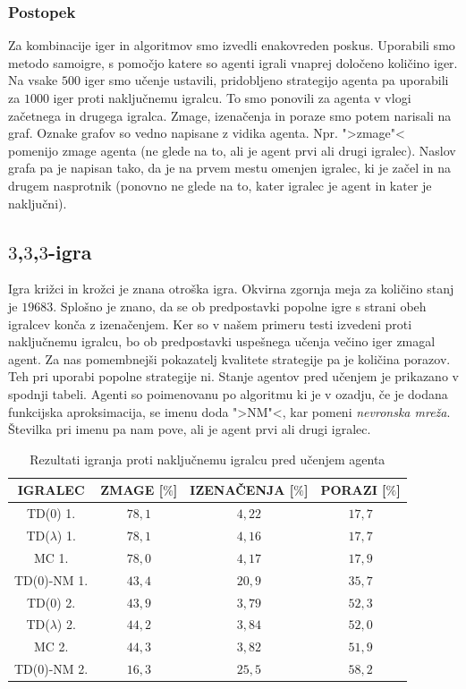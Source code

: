 \documentclass[12pt,a4paper]{amsart}
\theoremstyle{definition} %
\theoremstyle{plain} %
\begin{document}
\subsubsection{Postopek}
Za kombinacije iger in algoritmov smo izvedli enakovreden poskus. Uporabili smo metodo samoigre, 
s pomočjo katere so agenti igrali vnaprej določeno količino iger. Na vsake $500$ iger smo učenje 
ustavili, pridobljeno strategijo agenta pa uporabili za $1000$ iger proti naključnemu igralcu. To smo 
ponovili za agenta v vlogi začetnega in drugega igralca. Zmage, izenačenja in poraze smo potem narisali 
na graf. Oznake grafov so vedno napisane z vidika agenta. Npr. ">zmage"< pomenijo zmage agenta (ne glede 
na to, ali je agent prvi ali drugi igralec). Naslov grafa pa je napisan tako, da je na prvem mestu 
omenjen igralec, ki je začel in na drugem nasprotnik (ponovno ne glede na to, kater igralec je agent 
in kater je naključni).

\subsection{$3$,$3$,$3$-igra}
Igra križci in krožci je znana otroška igra. Okvirna zgornja meja za količino stanj je $19683$. 
Splošno je znano, da se ob predpostavki popolne igre s strani obeh igralcev konča z izenačenjem. 
Ker so v našem primeru testi izvedeni proti naključnemu igralcu, bo ob predpostavki uspešnega 
učenja večino iger zmagal agent. Za nas pomembnejši pokazatelj kvalitete strategije pa je količina 
porazov. Teh pri uporabi popolne strategije ni. Stanje agentov pred učenjem je prikazano v spodnji 
tabeli. Agenti so poimenovanu po algoritmu ki je v ozadju, če je dodana funkcijska aproksimacija, 
se imenu doda ">NM"<, kar pomeni \textit{nevronska mreža}. Številka pri imenu pa nam pove, ali je 
agent prvi ali drugi igralec.

\begin{center}
    \begin{table}[H]
        \begin{tabular}{| c | c | c | c |}
            \hline
            IGRALEC & ZMAGE [$\%$]& IZENAČENJA [$\%$]& PORAZI [$\%$]\\
            \hline
            TD($0$) 1.&$78,1$&$4,22$&$17,7$\\
            TD($\lambda$) 1.&$78,1$&$4,16$&$17,7$\\
            MC 1.&$78,0$&$4,17$&$17,9$\\
            TD($0$)-NM 1.&$43,4$&$20,9$&$35,7$\\
            \hline
            TD($0$) 2.&$43,9$&$3,79$&$52,3$\\
            TD($\lambda$) 2.&$44,2$&$3,84$&$52,0$\\
            MC 2.&$44,3$&$3,82$&$51,9$\\
            TD($0$)-NM 2.&$16,3$&$25,5$&$58,2$\\
            \hline
    \end{tabular}
    \caption{Rezultati igranja proti naključnemu igralcu pred učenjem agenta}
    \end{table}
\end{center}
\end{document}
